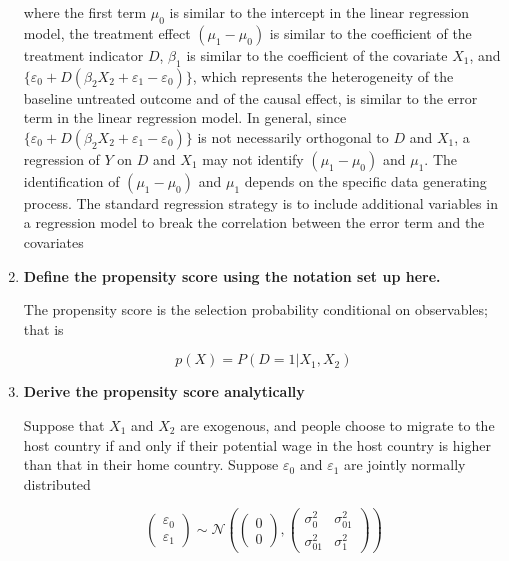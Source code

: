 \documentclass[11pt]{article}
\begin{document}
\begin{enumerate}
                where the first term $\mu_0$ is similar to the intercept in the linear regression model, the treatment effect $(\mu_1 - \mu_0)$ is similar to the coeﬀicient of the treatment indicator $D$, $\beta_1$ is similar to the coeﬀicient of the covariate $X_1$, and $\{\varepsilon_0 + D(\beta_2 X_2 + \varepsilon_1 - \varepsilon_0)\}$, which represents the heterogeneity of the baseline untreated outcome and of the causal effect, is similar to the error term in the linear regression model. In general, since $\{\varepsilon_0 + D(\beta_2 X_2 + \varepsilon_1 - \varepsilon_0)\}$ is not necessarily orthogonal to $D$ and $X_1$, a regression of $Y$ on $D$ and $X_1$ may not identify $(\mu_1 - \mu_0)$ and $\mu_1$. The identification of $(\mu_1 - \mu_0)$ and $\mu_1$ depends on the specific data generating process. The standard regression strategy is to include additional variables in a regression model to break the correlation between the error term and the covariates
            
            \item {\bf Define the propensity score using the notation set up here.}
            
            The propensity score is the selection probability conditional on observables; that is

            \[
                p(X) = P(D = 1 | X_1, X_2)
            \]
            
            \item {\bf Derive the propensity score analytically}
            
            Suppose that $X_1$ and $X_2$ are exogenous, and people choose to migrate to the host country if and only if their potential wage in the host country is higher than that in their home country. Suppose $\varepsilon_0$ and $\varepsilon_1$ are jointly normally distributed

            \[
                \begin{pmatrix}
                    \varepsilon_0 \\
                    \varepsilon_1
                    \end{pmatrix}
                    \sim \mathcal{N}
                    \left(
                    \begin{pmatrix}
                        0 \\
                        0
                    \end{pmatrix},
                    \begin{pmatrix}
                        \sigma_0^2    & \sigma_{01}^2 \\
                        \sigma_{01}^2 & \sigma_1^2
                    \end{pmatrix}
                    \right)
            \]


\end{enumerate}
\end{document}
